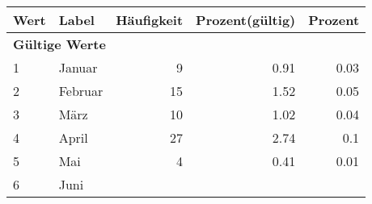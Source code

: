      \begin{longtable}{lXrrr}
     \toprule
     \textbf{Wert} & \textbf{Label} & \textbf{Häufigkeit} & \textbf{Prozent(gültig)} & \textbf{Prozent} \\
     \endhead
     \midrule
     \multicolumn{5}{l}{\textbf{Gültige Werte}}\\

     1 &
     \multicolumn{1}{X}{ Januar   } &


       \num{9} &
       \num[round-mode=places,round-precision=2]{0,91} &
         \num[round-mode=places,round-precision=2]{0,03} \\

     2 &
     \multicolumn{1}{X}{ Februar   } &


       \num{15} &
       \num[round-mode=places,round-precision=2]{1,52} &
         \num[round-mode=places,round-precision=2]{0,05} \\

     3 &
     \multicolumn{1}{X}{ März   } &


       \num{10} &
       \num[round-mode=places,round-precision=2]{1,02} &
         \num[round-mode=places,round-precision=2]{0,04} \\

     4 &
     \multicolumn{1}{X}{ April   } &


       \num{27} &
       \num[round-mode=places,round-precision=2]{2,74} &
         \num[round-mode=places,round-precision=2]{0,1} \\

     5 &
     \multicolumn{1}{X}{ Mai   } &


       \num{4} &
       \num[round-mode=places,round-precision=2]{0,41} &
         \num[round-mode=places,round-precision=2]{0,01} \\

     6 &
     \multicolumn{1}{X}{ Juni   } &



\end{longtable}
